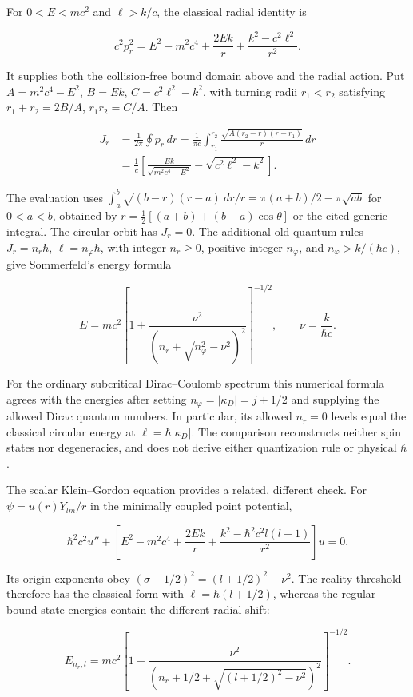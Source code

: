 \documentclass[11pt,a4paper]{article}
\begin{document}
For \(0<E<mc^2\) and \(\ell>k/c\), the classical radial identity is

\[c^2p_r^2=E^2-m^2c^4+\frac{2Ek}{r}
 +\frac{k^2-c^2\ell^2}{r^2}.\]

It supplies both the collision-free bound domain above and the radial
action. Put \(A=m^2c^4-E^2\), \(B=Ek\), \(C=c^2\ell^2-k^2\), with
turning radii \(r_1<r_2\) satisfying \(r_1+r_2=2B/A\), \(r_1r_2=C/A\).
Then

\[\begin{aligned}
J_r&=\frac1{2\pi}\oint p_r\,dr
 =\frac1{\pi c}\int_{r_1}^{r_2}
       \frac{\sqrt{A(r_2-r)(r-r_1)}}r\,dr\\
 &=\frac1c\left[\frac{Ek}{\sqrt{m^2c^4-E^2}}
                 -\sqrt{c^2\ell^2-k^2}\right].
\end{aligned}\]

The evaluation uses
\(\int_a^b\sqrt{(b-r)(r-a)}\,dr/r =\pi(a+b)/2-\pi\sqrt{ab}\) for
\(0<a<b\), obtained by \(r=\tfrac12[(a+b)+(b-a)\cos\theta]\) or the
cited generic integral. The circular orbit has \(J_r=0\). The additional
old-quantum rules \(J_r=n_r\hbar\), \(\ell=n_\varphi\hbar\), with
integer \(n_r\ge0\), positive integer \(n_\varphi\), and
\(n_\varphi>k/(\hbar c)\), give Sommerfeld's energy formula

\[E=mc^2\left[1+
 \frac{\nu^2}{(n_r+\sqrt{n_\varphi^2-\nu^2})^2}\right]^{-1/2},
\qquad \nu=\frac{k}{\hbar c}.\]

For the ordinary subcritical Dirac--Coulomb spectrum this numerical
formula agrees with the energies after setting
\(n_\varphi=|\kappa_D|=j+1/2\) and supplying the allowed Dirac quantum
numbers. In particular, its allowed \(n_r=0\) levels equal the classical
circular energy at \(\ell=\hbar|\kappa_D|\). The comparison reconstructs
neither spin states nor degeneracies, and does not derive either
quantization rule or physical \(\hbar\).

The scalar Klein--Gordon equation provides a related, different check.
For \(\psi=u(r)Y_{lm}/r\) in the minimally coupled point potential,

\[\hbar^2c^2u''+\left[E^2-m^2c^4+\frac{2Ek}{r}
 +\frac{k^2-\hbar^2c^2l(l+1)}{r^2}\right]u=0.\]

Its origin exponents obey \((\sigma-1/2)^2=(l+1/2)^2-\nu^2\). The
reality threshold therefore has the classical form with
\(\ell=\hbar(l+1/2)\), whereas the regular bound-state energies contain
the different radial shift:

\[E_{n_r,l}=mc^2\left[1+
 \frac{\nu^2}{(n_r+1/2+\sqrt{(l+1/2)^2-\nu^2})^2}\right]^{-1/2}.\]
\end{document}
